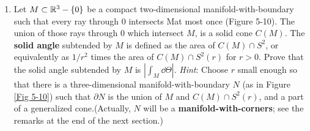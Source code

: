 \begin{problems}
{\begin{enumerate}[label=(\alph*)]
                part of a \textbf{generalized cone}, that is, $M$ is the union of segment of rays through the origin, show
                that $\int_M\dd\Theta =0$. 
            \item Let $M\subset\mathbb{R}^3-\{0\}$ be a compact two-dimensional manifold-with-boundary 
                such that every ray through 0 intersects Mat most once (Figure 5-10).
                The union of those rays through 0 which intersect $M$, is a solid cone $C(M)$. 
                The \textbf{solid angle} subtended by $M$ is defined as the area of $C(M)\cap S^2$, or 
                equivalently as $1/r^2$ times the area of $C(M)\cap S^2(r)$ for $r > 0$.
                Prove that the solid angle subtended by $M$ is $|\int_M\dd\Theta|$.
                \textit{Hint}: Choose $r$ small enough so that there is a three-dimensional 
                manifold-with-boundary $N$ (as in Figure \ref{Fig 5-10}) such that $\partial N$ is the 
                union of $M$ and $C(M)\cap S^2(r)$, and a part of a generalized cone.(Actually, $N$ 
                will be a \textbf{manifold-with-corners}; see the remarks at the end of the next section.)


\end{enumerate}}
\end{problems}
